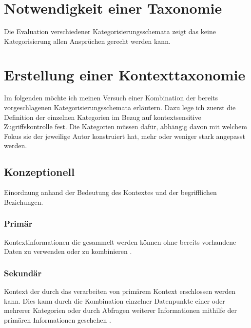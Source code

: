 \section{Notwendigkeit einer Taxonomie}
Die Evaluation verschiedener Kategorisierungsschemata zeigt das keine Kategorisierung allen Ansprüchen gerecht werden kann\cite{perera_context_2014}.
\section{ Erstellung einer Kontexttaxonomie }
Im folgenden möchte ich meinen Versuch einer Kombination der bereits vorgeschlagenen Kategorisierungsschemata erläutern. Dazu lege ich zuerst die Definition der einzelnen Kategorien im Bezug auf kontextsensitive Zugriffskontrolle fest. Die Kategorien müssen dafür, abhängig davon mit welchem Fokus sie der jeweilige Autor konstruiert hat, mehr oder weniger stark angepasst werden.
\subsection{Konzeptionell}
Einordnung anhand der Bedeutung des Kontextes und der begrifflichen Beziehungen.
\subsubsection{Primär}
Kontextinformationen die gesammelt werden können ohne bereits vorhandene Daten zu verwenden oder zu kombinieren \cite{abowd_towards_1999}. 
\subsubsection{Sekundär}
Kontext der durch das verarbeiten von primärem Kontext erschlossen werden kann. Dies kann durch die Kombination einzelner Datenpunkte einer oder mehrerer Kategorien oder durch Abfragen weiterer Informationen mithilfe der primären Informationen geschehen \cite{abowd_towards_1999}.
